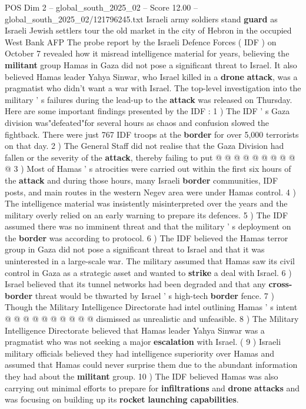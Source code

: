 \begin{textsample}{POS Dim 2 – global\_south\_2025\_02 – Score 12.00 – global\_south\_2025\_02/121796245.txt}  \label{ex:f2_pos_374}
Israeli army soldiers stand \textbf{guard} as Israeli Jewish settlers tour the old market in the city of Hebron in the occupied West Bank AFP The probe report by the Israeli Defence Forces ( IDF ) on October 7 revealed how it misread intelligence material for years, believing the \textbf{militant} group Hamas in Gaza did not pose a significant threat to Israel.
It also believed Hamas leader Yahya Sinwar, who Israel killed in a \textbf{drone} \textbf{attack}, was a pragmatist who didn't want a war with Israel.
The top-level investigation into the military ' s failures during the lead-up to the \textbf{attack} was released on Thursday.
Here are some important findings presented by the IDF : 1 ) The IDF ' s Gaza division was"defeated"for several hours as chaos and confusion slowed the fightback.
There were just 767 IDF troops at the \textbf{border} for over 5,000 terrorists on that day. 2 ) The General Staff did not realise that the Gaza Division had fallen or the severity of the \textbf{attack}, thereby failing to put @ @ @ @ @ @ @ @ @ @ 3 ) Most of Hamas ' s atrocities were carried out within the first six hours of the \textbf{attack} and during those hours, many Israeli \textbf{border} communities, IDF posts, and main routes in the western Negev area were under Hamas control. 4 ) The intelligence material was insistently misinterpreted over the years and the military overly relied on an early warning to prepare its defences. 5 ) The IDF assumed there was no imminent threat and that the military ' s deployment on the \textbf{border} was according to protocol. 6 ) The IDF believed the Hamas terror group in Gaza did not pose a significant threat to Israel and that it was uninterested in a large-scale war.
The military assumed that Hamas saw its civil control in Gaza as a strategic asset and wanted to \textbf{strike} a deal with Israel. 6 ) Israel believed that its tunnel networks had been degraded and that any \textbf{cross-border} threat would be thwarted by Israel ' s high-tech \textbf{border} fence. 7 ) Though the Military Intelligence Directorate had intel outlining Hamas ' s intent @ @ @ @ @ @ @ @ @ @ dismissed as unrealistic and unfeasible. 8 ) The Military Intelligence Directorate believed that Hamas leader Yahya Sinwar was a pragmatist who was not seeking a major \textbf{escalation} with Israel. ( 9 ) Israeli military officials believed they had intelligence superiority over Hamas and assumed that Hamas could never surprise them due to the abundant information they had about the \textbf{militant} group. 10 ) The IDF believed Hamas was also carrying out minimal efforts to prepare for \textbf{infiltrations} and \textbf{drone} \textbf{attacks} and was focusing on building up its \textbf{rocket} \textbf{launching} \textbf{capabilities}.

\end{textsample}
